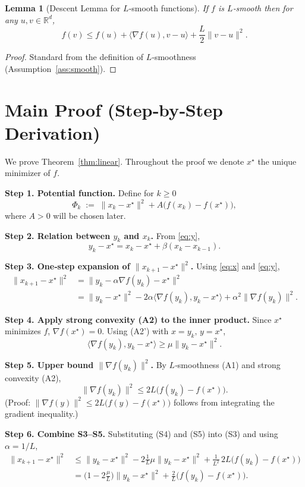 \documentclass{article}
\newtheorem{lemma}{Lemma}
\newcommand{\R}{\mathbb{R}}
\begin{document}
\begin{lemma}[Descent Lemma for $L$‑smooth functions]\label{lem:descent}
If $f$ is $L$‑smooth then for any $u,v\in\R^{d}$,
\[
f(v)\le f(u)+\langle\nabla f(u),v-u\rangle+\frac{L}{2}\|v-u\|^{2}.
\tag{L2}
\]
\end{lemma}
\begin{proof}
Standard from the definition of $L$‑smoothness (Assumption~\ref{ass:smooth}).
\end{proof}

\section*{Main Proof (Step‑by‑Step Derivation)}
We prove Theorem~\ref{thm:linear}.  Throughout the proof we denote $x^{\star}$ the unique minimizer of $f$.

\bigskip
\noindent\textbf{Step 1.  Potential function.}  
Define for $k\ge0$
\[
\Phi_{k}\;:=\; \|x_{k}-x^{\star}\|^{2}+A\bigl(f(x_{k})-f(x^{\star})\bigr),
\tag{P1}
\]
where $A>0$ will be chosen later.  

\noindent\textbf{Step 2.  Relation between $y_{k}$ and $x_{k}$.}  
From \eqref{eq:y},
\[
y_{k}-x^{\star}=x_{k}-x^{\star}+\beta (x_{k}-x_{k-1}).
\tag{S2}
\]

\noindent\textbf{Step 3.  One‑step expansion of $\|x_{k+1}-x^{\star}\|^{2}$.}  
Using \eqref{eq:x} and \eqref{eq:y},
\[
\begin{aligned}
\|x_{k+1}-x^{\star}\|^{2}
&= \|y_{k}-\alpha\nabla f(y_{k})-x^{\star}\|^{2}\\
&= \|y_{k}-x^{\star}\|^{2}
-2\alpha\langle\nabla f(y_{k}),y_{k}-x^{\star}\rangle
+\alpha^{2}\|\nabla f(y_{k})\|^{2}.
\end{aligned}
\tag{S3}
\]

\noindent\textbf{Step 4.  Apply strong convexity (A2) to the inner product.}  
Since $x^{\star}$ minimizes $f$, $\nabla f(x^{\star})=0$.  Using (A2') with $x=y_{k},\,y=x^{\star}$,
\[
\langle\nabla f(y_{k}),y_{k}-x^{\star}\rangle
\ge \mu\|y_{k}-x^{\star}\|^{2}.
\tag{S4}
\]

\noindent\textbf{Step 5.  Upper bound $\|\nabla f(y_{k})\|^{2}$.}  
By $L$‑smoothness (A1) and strong convexity (A2),
\[
\|\nabla f(y_{k})\|^{2}
\le 2L\bigl(f(y_{k})-f(x^{\star})\bigr).
\tag{S5}
\]
(Proof: $\|\nabla f(y)\|^{2}\le2L\bigl(f(y)-f(x^{\star})\bigr)$ follows from integrating the gradient inequality.)

\noindent\textbf{Step 6.  Combine S3–S5.}  
Substituting (S4) and (S5) into (S3) and using $\alpha=1/L$,
\[
\begin{aligned}
\|x_{k+1}-x^{\star}\|^{2}
&\le \|y_{k}-x^{\star}\|^{2}
-2\frac{1}{L}\mu\|y_{k}-x^{\star}\|^{2}
+ \frac{1}{L^{2}}\,2L\bigl(f(y_{k})-f(x^{\star})\bigr)\\
&= \bigl(1-2\frac{\mu}{L}\bigr)\|y_{k}-x^{\star}\|^{2}
+\frac{2}{L}\bigl(f(y_{k})-f(x^{\star})\bigr).
\end{aligned}
\tag{S6}
\]
\end{document}
